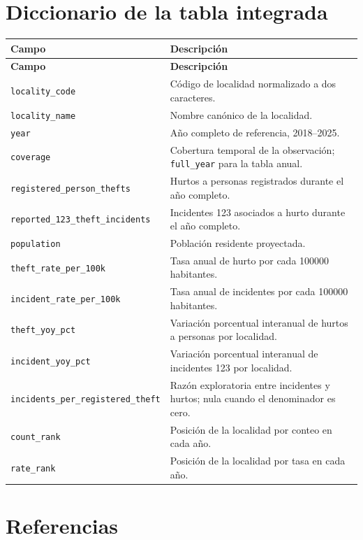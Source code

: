 \documentclass[11pt,letterpaper,oneside]{report}
\begin{document}
\chapter{Diccionario de la tabla integrada}

\begin{longtable}{L{0.33\textwidth}L{0.59\textwidth}}
\toprule
\textbf{Campo} & \textbf{Descripción} \\
\midrule
\endfirsthead
\toprule
\textbf{Campo} & \textbf{Descripción} \\
\midrule
\endhead
\texttt{locality\_code} & Código de localidad normalizado a dos caracteres. \\
\texttt{locality\_name} & Nombre canónico de la localidad. \\
\texttt{year} & Año completo de referencia, 2018--2025. \\
\texttt{coverage} & Cobertura temporal de la observación; \texttt{full\_year} para la tabla anual. \\
\texttt{registered\_person\_thefts} & Hurtos a personas registrados durante el año completo. \\
\texttt{reported\_123\_theft\_incidents} & Incidentes 123 asociados a hurto durante el año completo. \\
\texttt{population} & Población residente proyectada. \\
\texttt{theft\_rate\_per\_100k} & Tasa anual de hurto por cada \num{100000} habitantes. \\
\texttt{incident\_rate\_per\_100k} & Tasa anual de incidentes por cada \num{100000} habitantes. \\
\texttt{theft\_yoy\_pct} & Variación porcentual interanual de hurtos a personas por localidad. \\
\texttt{incident\_yoy\_pct} & Variación porcentual interanual de incidentes 123 por localidad. \\
\texttt{incidents\_per\_registered\_theft} & Razón exploratoria entre incidentes y hurtos; nula cuando el denominador es cero. \\
\texttt{count\_rank} & Posición de la localidad por conteo en cada año. \\
\texttt{rate\_rank} & Posición de la localidad por tasa en cada año. \\
\bottomrule
\end{longtable}

\chapter{Referencias}
\end{document}

